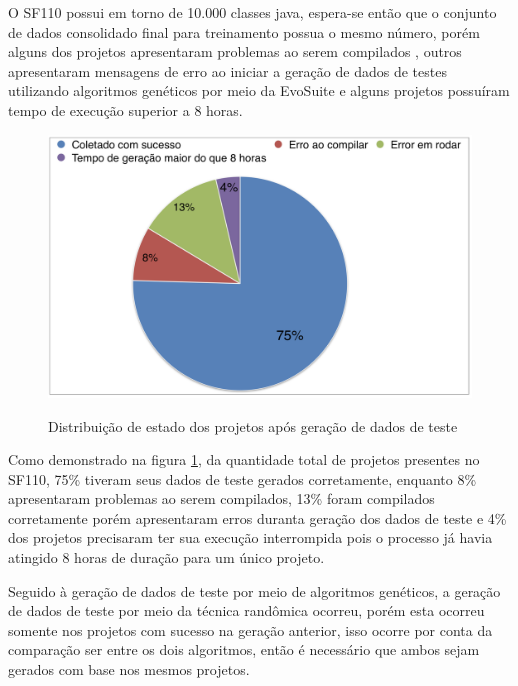 \documentclass[
	12pt,				%
	oneside,			%
	a4paper,			%
	english,			%
	brazil				%
	]{abntex2ppgsi}
\begin{document}
 O SF110 possui em torno de 10.000 classes java, espera-se então que o conjunto de dados consolidado final para treinamento possua o mesmo número, porém alguns dos projetos apresentaram problemas ao serem compilados , outros apresentaram mensagens de erro ao iniciar a geração de dados de testes utilizando algoritmos genéticos por meio da EvoSuite e alguns projetos possuíram tempo de execução superior a 8 horas.



\begin{figure}[H]%
	\centering
 	  \caption{Distribuição de estado dos projetos após geração de dados de teste}
		\includegraphics[width=\textwidth]{status_projetos.png}
	\label{fig:distribuicao-estados-projetos}
\end{figure}

Como demonstrado na figura \ref{fig:distribuicao-estados-projetos}, da quantidade total de projetos presentes no SF110, 75\% tiveram seus dados de teste gerados corretamente, enquanto 8\% apresentaram problemas ao serem compilados, 13\% foram compilados corretamente porém apresentaram erros duranta geração dos dados de teste e 4\% dos projetos precisaram ter sua execução interrompida pois o processo já havia atingido 8 horas de duração para um único projeto.

Seguido à geração de dados de teste por meio de algoritmos genéticos, a geração de dados de teste por meio da técnica randômica ocorreu, porém esta ocorreu somente nos projetos com sucesso na geração anterior, isso ocorre por conta da comparação ser entre os dois algoritmos, então é necessário que ambos sejam gerados com base nos mesmos projetos.
\end{document}
